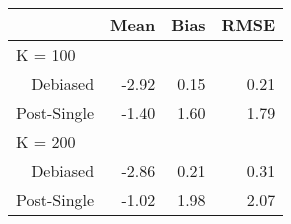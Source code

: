 \captionsetup[table]{labelformat=empty,skip=1pt}
\begin{longtable}{r|rrr}
\toprule
\multicolumn{1}{l}{} & Mean & Bias & RMSE \\ 
\midrule
\multicolumn{1}{l}{K = 100} \\ 
\midrule
Debiased & -2.92 & 0.15 & 0.21 \\ 
Post-Single & -1.40 & 1.60 & 1.79 \\ 
\midrule
\multicolumn{1}{l}{K = 200} \\ 
\midrule
Debiased & -2.86 & 0.21 & 0.31 \\ 
Post-Single & -1.02 & 1.98 & 2.07 \\ 
\bottomrule
\end{longtable}


